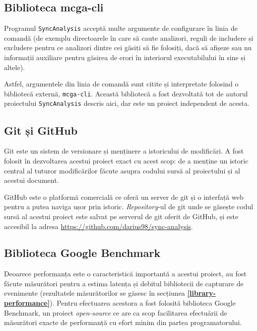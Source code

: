\subsection{Biblioteca mcga-cli}

Programul \lstinline{SyncAnalysis} acceptă multe argumente de
configurare în linia de comandă (de exemplu directoarele în care să
caute analizori, reguli de includere și excludere pentru ce analizori
dintre cei găsiți să fie folosiți, dacă să afișeze sau nu informații
auxiliare pentru găsirea de erori în interiorul executabilului în sine
și altele).

Astfel, argumentele din linia de comandă sunt citite și interpretate
folosind o bibliotecă externă, \lstinline{mcga-cli}\cite{mcga-cli}.
Această bibliotecă a fost dezvoltată tot de autorul proiectului
\lstinline{SyncAnalysis} descris aici, dar este un proiect independent
de acesta.

\subsection{Git și GitHub}

Git\cite{git} este un sistem de versionare și menținere a istoricului de
modificări. A fost folosit în dezvoltarea acestui proiect exact cu acest
scop: de a menține un istoric central al tuturor modificărilor făcute
asupra codului sursă al proiectului și al acestui document.

GitHub\cite{GitHub} este o platformă comercială ce oferă un server de
git și o interfață web pentru a putea naviga ușor prin istoric.
\textit{Repository}-ul de git unde se găsește codul sursă al acestui
proiect este salvat pe serverul de git oferit de GitHub, și este
accesibil la adresa \url{https://github.com/darius98/sync-analysis}.

\subsection{Biblioteca Google Benchmark}

Deoarece performanța este o caracteristică importantă a acestui proiect,
au fost făcute măsurători pentru a estima latența și debitul bibliotecii
de capturare de evenimente (rezultatele măsurătorilor se găsesc în
secțiunea \textbf{\ref{library-performance}}). Pentru efectuarea
acestora a fost folosită biblioteca Google
Benchmark\cite{GoogleBenchmark}, un proiect \textit{open-source} ce are
ca scop facilitarea efectuării de măsurători exacte de performanță cu
efort minim din partea programatorului.
